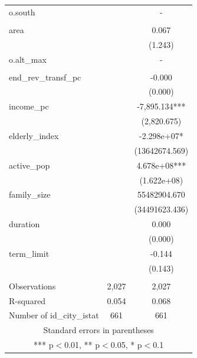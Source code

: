 \documentclass[]{article}
\begin{document}
\begin{tabular}{lcc}
o.south &  & - \\
 &  &  \\
area &  & 0.067 \\
 &  & (1.243) \\
o.alt\_max &  & - \\
 &  &  \\
end\_rev\_transf\_pc &  & -0.000 \\
 &  & (0.000) \\
income\_pc &  & -7,895.134*** \\
 &  & (2,820.675) \\
elderly\_index &  & -2.298e+07* \\
 &  & (13642674.569) \\
active\_pop &  & 4.678e+08*** \\
 &  & (1.622e+08) \\
family\_size &  & 55482904.670 \\
 &  & (34491623.436) \\
duration &  & 0.000 \\
 &  & (0.000) \\
term\_limit &  & -0.144 \\
 &  & (0.143) \\
 &  &  \\
Observations & 2,027 & 2,027 \\
R-squared & 0.054 & 0.068 \\
 Number of id\_city\_istat & 661 & 661 \\ \hline
\multicolumn{3}{c}{ Standard errors in parentheses} \\
\multicolumn{3}{c}{ *** p$<$0.01, ** p$<$0.05, * p$<$0.1} \\
\end{tabular}
\end{document}
